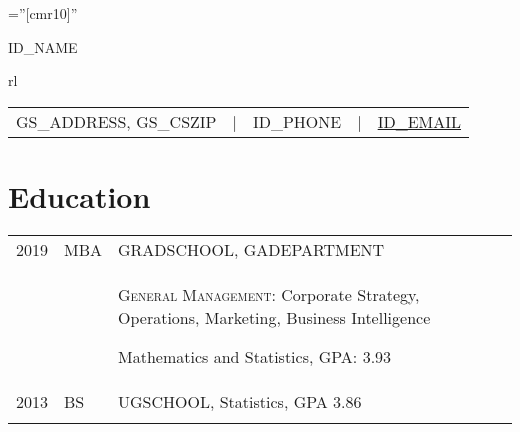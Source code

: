 \documentclass[a4paper,10pt]{article}
\begin{document}

\sloppy






\font\fb=''[cmr10]'' %

\par{\centering
		{\Huge  \textsc{ID_NAME}}
		\smallskip \par
		\begin{tabular}{rl}
		\small
		\begin{tabular}{rllll}
			GS_ADDRESS, GS_CSZIP 	&
			| & ID_PHONE			&
    		| & \href{mailto:ID_EMAIL}{ID_EMAIL}	\\
		\end{tabular}
		\end{tabular}
		\bigskip
		\par}






\smallskip
\section{Education}
\begin{supertabular}{p{2cm} p{1.0cm} p{13.9cm}}
	\textsc{2019}		&		\textsc{MBA} & \textsc{GRADSCHOOL}, \small GADEPARTMENT \\
					&&		 \begin{enumerate*}[label =$\diamond$, itemjoin={\newline}]
							 \item \footnotesize  \textsc{General Management:} Corporate Strategy, Operations, Marketing, Business Intelligence
							 \item \footnotesize Mathematics and Statistics, GPA: 3.93
							 \end{enumerate*}  \\
	\textsc{2013} 	& 	\textsc{BS} & \textsc{UGSCHOOL}, \small Statistics, GPA 3.86 \\
	 \\
\end{supertabular}


\smallskip
\end{document}
